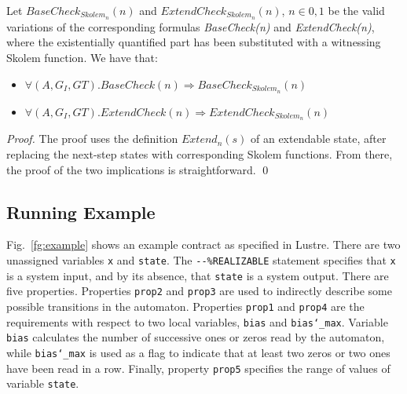 \begin{theorem} Let $BaseCheck_{Skolem_n}(n)$ and
$ExtendCheck_{Skolem_n}(n)$, $n \in {0,1}$ be the valid
variations of the corresponding formulas \textit{BaseCheck(n)} and
\textit{ExtendCheck(n)}, where the existentially quantified part has been substituted
with a witnessing Skolem function. We have that:
\begin{itemize}
\item $\forall (A,G_{I},G{T}). BaseCheck(n) \Rightarrow BaseCheck_{Skolem_n}(n)$
\item $\forall (A,G_{I},G{T}). ExtendCheck(n) \Rightarrow
ExtendCheck_{Skolem_n}(n)$
\end{itemize}
\end{theorem}
\begin{proof}
The proof uses the definition \textit{$Extend_n(s)$} of an extendable state,
after replacing the next-step states with corresponding Skolem functions. From there,
the proof of the two implications is straightforward.
\qed
\end{proof}

\subsection{Running Example} 
 
Fig.~\ref{fg:example} shows an example contract as specified in
Lustre. There are two unassigned variables \texttt{x} and
\texttt{state}. The \texttt{{-}{-}\%REALIZABLE} statement specifies
that \texttt{x} is a system input, and by its absence, that
\texttt{state} is a system output. There are five properties.
Properties \texttt{prop2} and \texttt{prop3} are used to indirectly
describe some possible transitions in the automaton. Properties
\texttt{prop1} and \texttt{prop4} are the requirements with respect to
two local variables, \texttt{bias} and \texttt{bias\char`_max}.
Variable \texttt{bias} calculates the number of successive ones or
zeros read by the automaton, while \texttt{bias\char`_max} is used as
a flag to indicate that at least two zeros or two ones have been read
in a row. Finally, property \texttt{prop5} specifies the range of
values of variable \texttt{state}.
 
